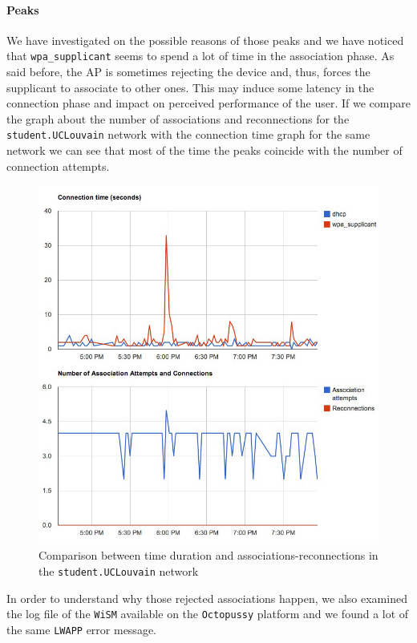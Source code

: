 \paragraph*{Peaks} We have investigated on the possible reasons of those peaks and we have noticed that \texttt{wpa\_supplicant} seems to spend a lot of time in the association phase. As said before, the AP is sometimes rejecting the device and, thus, forces the supplicant to associate to other ones. This may induce some latency in the connection phase and impact on perceived performance of the user. If we compare the graph about the number of associations and reconnections for the \texttt{student.UCLouvain} network with the connection time graph for the same network we can see that most of the time the peaks coincide with the number of connection attempts. 

\begin{figure}[H]
	\centering
   \includegraphics[width=1\textwidth]{Pictures/chapter6/time-explain.jpg}
   \caption{Comparison between time duration and associations-reconnections in the \texttt{student.UCLouvain} network}
\end{figure} 

In order to understand why those rejected associations happen, we also examined the log file of the \texttt{WiSM} available on the \texttt{Octopussy} platform \cite{octopussy} and we found a lot of the same \texttt{LWAPP} error message.\\

